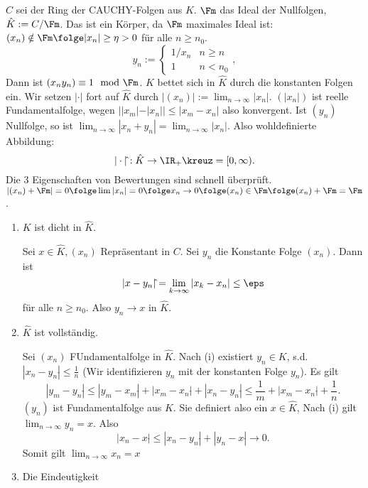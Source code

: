\renewcommand{\lecdate}{14.01.2015}

\begin{Beweis}
$C$ sei der Ring der CAUCHY-Folgen aus $K$. $\Fm$ das Ideal der Nullfolgen, $\hat K:=C/\Fm$. Das ist ein Körper, da $\Fm$ maximales Ideal ist: $(x_n)\notin\Fm \folge |x_n|\geq\eta>0$ für alle $n\geq n_0$. 
\[ y_n:=\begin{cases}
         1/x_n	& n\geq n\\
         1 	& n<n_0	
        \end{cases},
\]
Dann ist $(x_ny_n)\equiv 1\mod{\Fm}$. $K$ bettet sich in $\hat K$ durch die konstanten Folgen ein. Wir setzen $|\cdot|$ fort auf $\hat K$ durch $|(x_n)|:=\lim_{n\rightarrow\infty}|x_n|$.
$(|x_n|)$ ist reelle Fundamentalfolge, wegen $||x_m|-|x_n||\leq |x_m-x_n|$ also konvergent. Ist $(y_n)$ Nullfolge, so ist $\lim_{n\rightarrow\infty} |x_n+y_n|=\lim_{n\rightarrow\infty} |x_n|$. Also wohldefinierte Abbildung: \[ |\cdot|\hat{}:\hat K\rightarrow \IR_+\kreuz=[0,\infty).\]
Die 3 Eigenschaften von Bewertungen sind schnell überprüft. $|(x_n)+\Fm|=0\folge\lim |x_n|=0 \folge x_n\rightarrow 0 \folge (x_n)\in\Fm\folge (x_n)+\Fm=\Fm$.

\begin{enumerate}
 \item $K$ ist dicht in $\hat K$.
 
 Sei $x\in \hat K, (x_n)$ Repräsentant in $C$. Sei $y_n$ die Konstante Folge $(x_n)$. Dann ist \[ |x-y_n|\hat{}=\lim_{k\rightarrow\infty} |x_k-x_n|\leq \eps\]
für alle $n\geq n_0$. Also $y_n\rightarrow x$ in $\hat K$.
\item $\hat K$ ist vollständig.

Sei $(x_n)$ FUndamentalfolge in $\hat K$. Nach (i) existiert $y_n\in K$, s.d. $|x_n-y_n|\hat{}\leq\frac{1}{n}$ (Wir identifizieren $y_n$ mit der konstanten Folge $y_n$).
Es gilt \[ |y_m-y_n|\hat{}\leq |y_m-x_m|\hat{}+|x_m-x_n|\hat{}+|x_n-y_n|\hat{}\leq \frac{1}{m}+|x_m-x_n|\hat{}+\frac{1}{n}.\]
\folge $(y_n)$ ist Fundamentalfolge aus $K$. Sie definiert also ein $x\in \hat K$, Nach (i) gilt $\lim_{n \rightarrow \infty}y_n=x$. Also
\[ |x_n-x|\hat{}\leq |x_n-y_n|\hat{} + |y_n-x|\hat{} \rightarrow 0.\]
Somit gilt $\lim_{n\rightarrow \infty}x_n=x$
\item Die Eindeutigkeit


\end{enumerate}
\end{Beweis}
